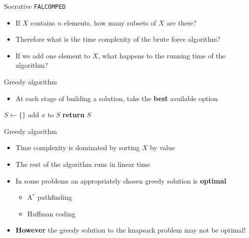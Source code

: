 \begin{frame}{Socrative \texttt{FALCOMPED}}
	\begin{itemize}
		\pause\item If $X$ contains $n$ elements, how many subsets of $X$ are there?
		\pause\item Therefore what is the time complexity of the brute force algorithm?
		\pause\item If we add one element to $X$, what happens to the running time of the algorithm?
	\end{itemize}
\end{frame}

\begin{frame}{Greedy algorithm}
	\begin{itemize}
		\pause\item At each stage of building a solution, take the \textbf{best} available option
	\end{itemize}
	\pause
	\begin{algorithmic}
			\pause\State $S \gets \{ \}$
			\pause{}
				\pause{}
					\pause\State add $x$ to $S$
				\pause\EndIf
			\pause\EndFor
			\pause\State \textbf{return} $S$
		\EndProcedure
	\end{algorithmic}
\end{frame}

\begin{frame}{Greedy algorithm}
	\begin{itemize}
		\pause\item Time complexity is dominated by sorting $X$ by value
		\pause\item The rest of the algorithm runs in linear time
		\pause\item In some problems an appropriately chosen greedy solution is \textbf{optimal}
			\begin{itemize}
				\pause\item A$^*$ pathfinding
				\pause\item Huffman coding
			\end{itemize}
		\pause\item \textbf{However} the greedy solution to the knapsack problem may not be optimal!
	\end{itemize}
\end{frame}

